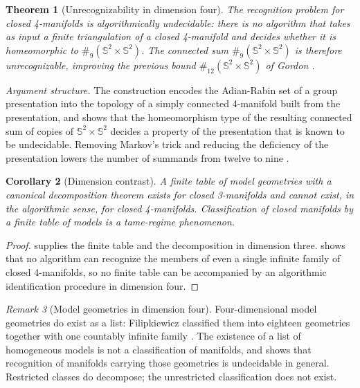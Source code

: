\documentclass[11pt,letterpaper]{article}
\newtheorem{theorem}{Theorem}[section]
\newtheorem{corollary}[theorem]{Corollary}
\theoremstyle{definition}
\theoremstyle{remark}
\newtheorem{remark}[theorem]{Remark}
\begin{document}
\begin{theorem}[Unrecognizability in dimension four]\label{thm:tancer}
The recognition problem for closed 4-manifolds is algorithmically undecidable: there is no algorithm that takes as input a finite triangulation of a closed 4-manifold and decides whether it is homeomorphic to $\#_9(\mathbb{S}^2 \times \mathbb{S}^2)$. The connected sum $\#_9(\mathbb{S}^2 \times \mathbb{S}^2)$ is therefore unrecognizable, improving the previous bound $\#_{12}(\mathbb{S}^2 \times \mathbb{S}^2)$ of Gordon \cite{tancer}.
\end{theorem}

\par\medskip\noindent\emph{Argument structure.}
The construction encodes the Adian-Rabin set of a group presentation into the topology of a simply connected 4-manifold built from the presentation, and shows that the homeomorphism type of the resulting connected sum of copies of $\mathbb{S}^2 \times \mathbb{S}^2$ decides a property of the presentation that is known to be undecidable. Removing Markov's trick and reducing the deficiency of the presentation lowers the number of summands from twelve to nine \cite{tancer}.
\par\medskip

\begin{corollary}[Dimension contrast]\label{cor:dimcontrast}
A finite table of model geometries with a canonical decomposition theorem exists for closed 3-manifolds and cannot exist, in the algorithmic sense, for closed 4-manifolds. Classification of closed manifolds by a finite table of models is a tame-regime phenomenon.
\end{corollary}

\begin{proof}
 supplies the finite table and the decomposition in dimension three.  shows that no algorithm can recognize the members of even a single infinite family of closed 4-manifolds, so no finite table can be accompanied by an algorithmic identification procedure in dimension four.
\end{proof}

\begin{remark}[Model geometries in dimension four]\label{rem:filipkiewicz}
Four-dimensional model geometries do exist as a list: Filipkiewicz classified them into eighteen geometries together with one countably infinite family \cite{hillman}. The existence of a list of homogeneous models is not a classification of manifolds, and  shows that recognition of manifolds carrying those geometries is undecidable in general. Restricted classes do decompose; the unrestricted classification does not exist.
\end{remark}
\end{document}

